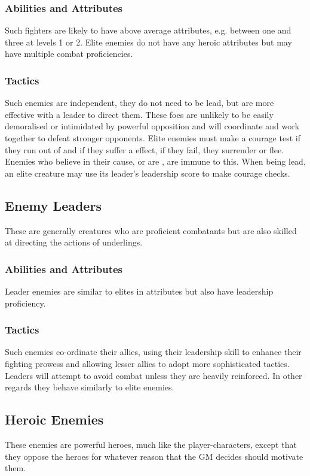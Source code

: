 \documentclass[a4paper,10pt,oneside]{book}
\newcommand{\textlf}[1]{\textbf{\titlecap{#1}}}
\begin{document}
\subsubsection{Abilities and Attributes}
Such fighters are likely to have above average attributes, e.g. between one and three at levels 1 or 2. Elite enemies do not have any heroic attributes but may have multiple combat proficiencies.
\subsubsection{Tactics}
Such enemies are independent, they do not need to be lead, but are more effective with a leader to direct them. These foes are unlikely to be easily demoralised or intimidated by powerful opposition and will coordinate and work together to defeat stronger opponents. Elite enemies must make a courage test if they run out of \textlf{endurance} and if they suffer a \textlf{badly-wounded} effect, if they fail, they surrender or flee. Enemies who believe in their cause, or are \textlf{mindless}, are immune to this. When being lead, an elite creature may use its leader's leadership score to make courage checks.

\subsection{Enemy Leaders}
These are generally creatures who are proficient combatants but are also skilled at directing the actions of underlings.
\subsubsection{Abilities and Attributes}
Leader enemies are similar to elites in attributes but also have leadership proficiency.
\subsubsection{Tactics}
Such enemies co-ordinate their allies, using their leadership skill to enhance their fighting prowess and allowing lesser allies to adopt more sophisticated tactics. Leaders will attempt to avoid combat unless they are heavily reinforced. In other regards they behave similarly to elite enemies.

\subsection{Heroic Enemies}
These enemies are powerful heroes, much like the player-characters, except that they oppose the heroes for whatever reason that the GM decides should motivate them.
\end{document}
